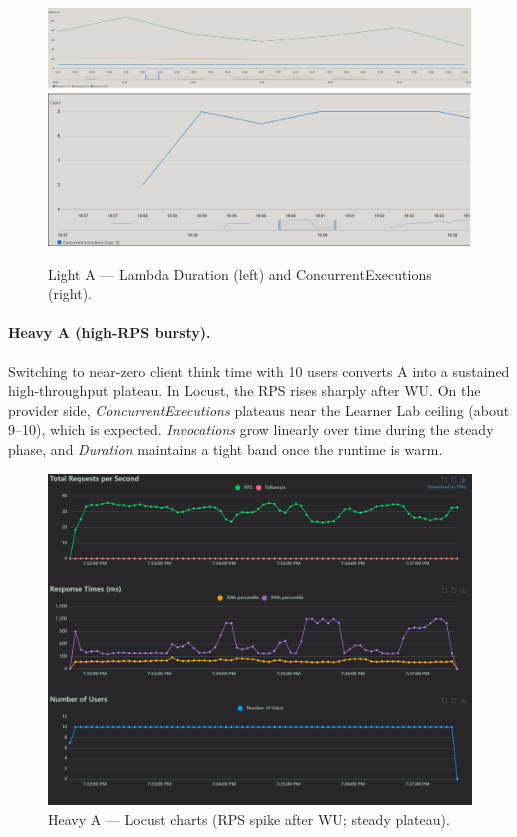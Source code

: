 \documentclass[11pt,a4paper]{article}
\begin{document}
\begin{figure}[h!] \centering
  \includegraphics[width=.48\linewidth]{"figures/lA - Duration.png"}\hfill
  \includegraphics[width=.48\linewidth]{"figures/lA - ConcExecutions.png"}
  \caption{Light A --- Lambda Duration (left) and ConcurrentExecutions (right).}
\end{figure}

\paragraph{Heavy A (high-RPS bursty).}
Switching to near-zero client think time with 10 users converts A into a sustained high-throughput plateau. In Locust, the RPS rises sharply after WU. On the provider side, \emph{ConcurrentExecutions} plateaus near the Learner Lab ceiling (about 9--10), which is expected. \emph{Invocations} grow linearly over time during the steady phase, and \emph{Duration} maintains a tight band once the runtime is warm.

\begin{figure}[h!] \centering
  \includegraphics[width=\linewidth]{"figures/hA - Charts.png"}
  \caption{Heavy A --- Locust charts (RPS spike after WU; steady plateau).}
\end{figure}
\end{document}
